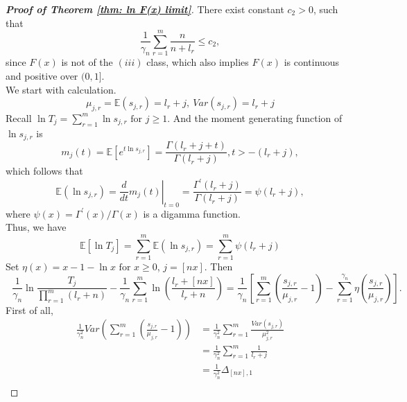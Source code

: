 \documentclass[12pt]{article}
\theoremstyle{plain}
\theoremstyle{definition}
\theoremstyle{remark}
\begin{document}
\begin{proof}[\textit{\textbf{Proof of Theorem \ref{thm: ln F(x) limit}}}]
	There exist constant $c_2>0$, such that $$\frac{1}{\gamma_{n}} \sum_{r=1}^{m} \frac{n}{n+l_{r}}\leq c_2,$$ since $F(x)$ is not of the $(iii)$ class, which also implies $F(x)$ is continuous and positive over $(0,1]$.\\
	We start with calculation.
	\begin{equation*}
		\mu_{j, r}=\mathbb{E}\left(s_{j, r}\right)=l_{r}+j,\ {Var}\left(s_{j, r}\right)=l_{r}+j
	\end{equation*}
	Recall $\ln T_{j}=\sum_{r=1}^{m} \ln s_{j, r} \text { for } j \geq 1$. And the moment generating function of $\ln s_{j, r}$ is 
	\begin{equation*}
		m_{j}(t)=\mathbb{E}\left[e^{t \ln s_{j, r}}\right]=\frac{\Gamma\left(l_{r}+j+t\right)}{\Gamma\left(l_{r}+j\right)}, t>-(l_r+j),
	\end{equation*}
	which follows that 
	\begin{equation*}
		\mathbb{E}\left(\ln s_{j, r}\right)=\left.\frac{d}{d t} m_{j}(t)\right|_{t=0}=\frac{\Gamma^{\prime}\left(l_{r}+j\right)}{\Gamma\left(l_{r}+j\right)}=\psi\left(l_{r}+j\right),
	\end{equation*}
	where $\psi(x)=\Gamma^{\prime}(x) / \Gamma(x)$ is a digamma function.\\
	Thus, we have 
	\begin{equation*}
		\mathbb{E}\left[\ln T_{j}\right]=\sum_{r=1}^{m} \mathbb{E}\left(\ln s_{j, r}\right)=\sum_{r=1}^{m} \psi\left(l_{r}+j\right)
	\end{equation*}
	Set $\eta(x)=x-1-\ln x \text { for } x \geq 0$, $j=[nx]$. Then
	\begin{equation}\label{formular_lnT_mid}
	\ \ \ \dfrac{1}{\gamma_{n}}\ln \frac{T_{j}}{\prod_{r=1}^{m}(l_r+n)}-\dfrac{1}{\gamma_{n}} \sum_{r=1}^{m}\ln (\frac{l_r+[nx]}{l_r+n})=\dfrac{1}{\gamma_{n}}[\sum_{r=1}^{m}(\frac{s_{j,r}}{\mu_{j,r}}-1)-\sum_{r=1}^{\gamma_{n}}\eta(\frac{s_{j,r}}{\mu_{j,r}})].
	\end{equation}
	First of all, 
	\begin{equation*}
		\begin{aligned}
			\frac{1}{\gamma_{n}^2} {Var}\left(\sum_{r=1}^{m}\left(\frac{s_{j, r}}{\mu_{j, r}}-1\right)\right) 
			&=\frac{1}{\gamma_{n}^2}\sum_{r=1}^{m} \frac{{Var}\left(s_{j, r}\right)}{\mu_{j, r}^{2}} \\ &=\frac{1}{\gamma_{n}^2}\sum_{r=1}^{m} \frac{1}{l_{r}+j} \\
			&=\frac{1}{\gamma_{n}^2}\Delta_{[nx], 1}\\

\end{aligned}
\end{equation*}
\end{proof}
\end{document}
